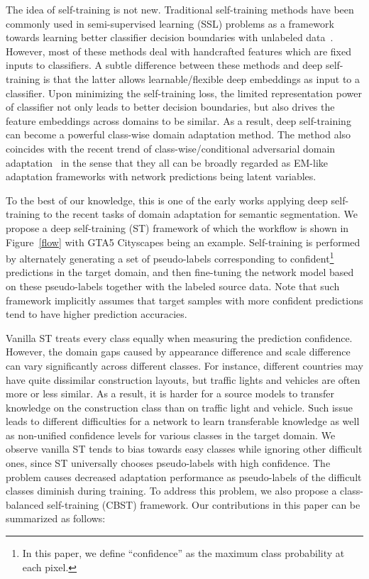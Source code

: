 \documentclass[runningheads]{llncs}
\begin{document}
The idea of self-training is not new. Traditional self-training methods have been commonly used in semi-supervised learning (SSL) problems as a framework towards learning better classifier decision boundaries with unlabeled data~\cite{grandvalet2005semi}. However, most of these methods deal with handcrafted features which are fixed inputs to classifiers. A subtle difference between these methods and deep self-training is that the latter allows learnable/flexible deep embeddings as input to a classifier. Upon minimizing the self-training loss, the limited representation power of classifier not only leads to better decision boundaries, but also drives the feature embeddings across domains to be similar. As a result, deep self-training can become a powerful class-wise domain adaptation method. The method also coincides with the recent trend of class-wise/conditional adversarial domain adaptation~\cite{Chen_2017_ICCV} in the sense that they all can be broadly regarded as EM-like adaptation frameworks with network predictions being latent variables.

To the best of our knowledge, this is one of the early works applying deep self-training to the recent tasks of domain adaptation for semantic segmentation. We propose a deep self-training (ST) framework of which the workflow is shown in Figure~\ref{flow} with GTA5  Cityscapes being an example. Self-training is performed by alternately generating a set of pseudo-labels corresponding to confident\footnote{In this paper, we define ``confidence'' as the maximum class probability at each pixel.} predictions in the target domain, and then fine-tuning the network model based on these pseudo-labels together with the labeled source data. Note that such framework implicitly assumes that target samples with more confident predictions tend to have higher prediction accuracies.

Vanilla ST treats every class equally when measuring the prediction confidence. However, the domain gaps caused by appearance difference and scale difference can vary significantly across different classes. For instance, different countries may have quite dissimilar construction layouts, but traffic lights and vehicles are often more or less similar. As a result, it is harder for a source models to transfer knowledge on the construction class than on traffic light and vehicle. Such issue leads to different difficulties for a network to learn transferable knowledge as well as non-unified confidence levels for various classes in the target domain. We observe vanilla ST tends to bias towards easy classes while ignoring other difficult ones, since ST universally chooses pseudo-labels with high confidence. The problem causes decreased adaptation performance as pseudo-labels of the difficult classes diminish during training. To address this problem, we also propose a class-balanced self-training (CBST) framework. Our contributions in this paper can be summarized as follows:
\end{document}
